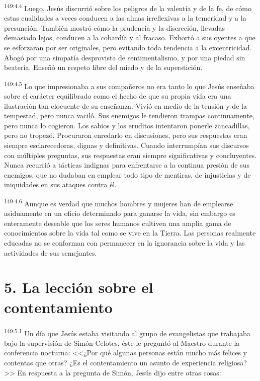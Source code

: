 \par 
\textsuperscript{149:4.4} Luego, Jesús discurrió sobre los peligros de la valentía y de la fe, de cómo estas cualidades a veces conducen a las almas irreflexivas a la temeridad y a la presunción. También mostró cómo la prudencia y la discreción, llevadas demasiado lejos, conducen a la cobardía y al fracaso. Exhortó a sus oyentes a que se esforzaran por ser originales, pero evitando toda tendencia a la excentricidad. Abogó por una simpatía desprovista de sentimentalismo, y por una piedad sin beatería. Enseñó un respeto libre del miedo y de la superstición.

\par 
\textsuperscript{149:4.5} Lo que impresionaba a sus compañeros no era tanto lo que Jesús enseñaba sobre el carácter equilibrado como el hecho de que su propia vida era una ilustración tan elocuente de su enseñanza. Vivió en medio de la tensión y de la tempestad, pero nunca vaciló. Sus enemigos le tendieron trampas continuamente, pero nunca lo cogieron. Los sabios y los eruditos intentaron ponerle zancadillas, pero no tropezó. Procuraron enredarlo en discusiones, pero sus respuestas eran siempre esclarecedoras, dignas y definitivas. Cuando interrumpían sus discursos con múltiples preguntas, sus respuestas eran siempre significativas y concluyentes. Nunca recurrió a tácticas indignas para enfrentarse a la continua presión de sus enemigos, que no dudaban en emplear todo tipo de mentiras, de injusticias y de iniquidades en sus ataques contra él.

\par 
\textsuperscript{149:4.6} Aunque es verdad que muchos hombres y mujeres han de emplearse asiduamente en un oficio determinado para ganarse la vida, sin embargo es enteramente deseable que los seres humanos cultiven una amplia gama de conocimientos sobre la vida tal como se vive en la Tierra. Las personas realmente educadas no se conforman con permanecer en la ignorancia sobre la vida y las actividades de sus semejantes.

\section*{5. La lección sobre el contentamiento}
\par 
\textsuperscript{149:5.1} Un día que Jesús estaba visitando al grupo de evangelistas que trabajaba bajo la supervisión de Simón Celotes, éste le preguntó al Maestro durante la conferencia nocturna: <<¿Por qué algunas personas están mucho más felices y contentas que otras? ¿Es el contentamiento un asunto de experiencia religiosa?>> En respuesta a la pregunta de Simón, Jesús dijo entre otras cosas:

